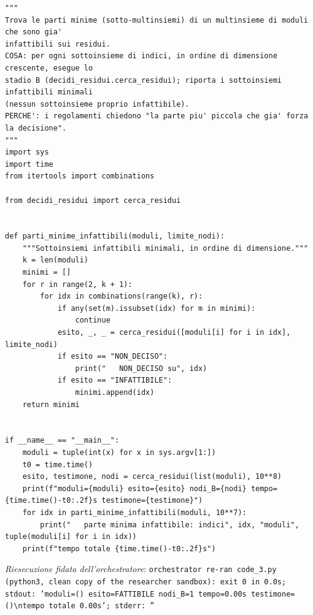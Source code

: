 \documentclass[11pt,a4paper]{article}
\begin{document}
\begin{lstlisting}[caption={attempt\_001 code\_3 [python, rigore exact] — Decision of the unique k=13 stage-A survivor (10,10,10,10,10,12,12,12,12,24,36,40,45): exh — verdetto del Referee: UNKNOWN\_STATUS}]
"""
Trova le parti minime (sotto-multinsiemi) di un multinsieme di moduli che sono gia'
infattibili sui residui.
COSA: per ogni sottoinsieme di indici, in ordine di dimensione crescente, esegue lo
stadio B (decidi_residui.cerca_residui); riporta i sottoinsiemi infattibili minimali
(nessun sottoinsieme proprio infattibile).
PERCHE': i regolamenti chiedono "la parte piu' piccola che gia' forza la decisione".
"""
import sys
import time
from itertools import combinations

from decidi_residui import cerca_residui


def parti_minime_infattibili(moduli, limite_nodi):
    """Sottoinsiemi infattibili minimali, in ordine di dimensione."""
    k = len(moduli)
    minimi = []
    for r in range(2, k + 1):
        for idx in combinations(range(k), r):
            if any(set(m).issubset(idx) for m in minimi):
                continue
            esito, _, _ = cerca_residui([moduli[i] for i in idx], limite_nodi)
            if esito == "NON_DECISO":
                print("   NON_DECISO su", idx)
            if esito == "INFATTIBILE":
                minimi.append(idx)
    return minimi


if __name__ == "__main__":
    moduli = tuple(int(x) for x in sys.argv[1:])
    t0 = time.time()
    esito, testimone, nodi = cerca_residui(list(moduli), 10**8)
    print(f"moduli={moduli} esito={esito} nodi_B={nodi} tempo={time.time()-t0:.2f}s testimone={testimone}")
    for idx in parti_minime_infattibili(moduli, 10**7):
        print("   parte minima infattibile: indici", idx, "moduli", tuple(moduli[i] for i in idx))
    print(f"tempo totale {time.time()-t0:.2f}s")

\end{lstlisting}
\noindent\emph{Riesecuzione fidata dell'orchestratore}: \texttt{orchestrator re-ran code\_3.py (python3, clean copy of the researcher sandbox): exit 0 in 0.0s; stdout: 'moduli=() esito=FATTIBILE nodi\_B=1 tempo=0.00s testimone=()\textbackslash{}ntempo totale 0.00s'; stderr: ''}
\end{document}
